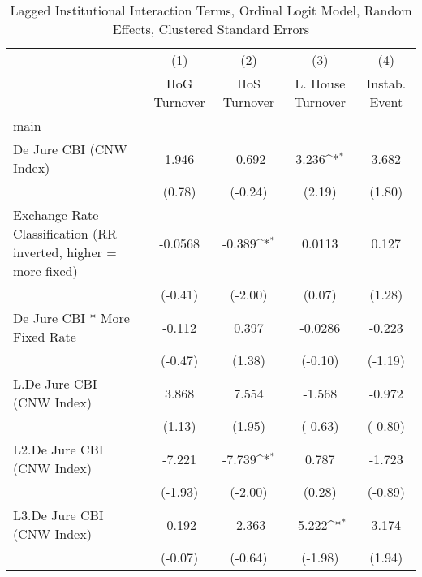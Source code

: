 {
\def\sym#1{\ifmmode^{#1}\else\(^{#1}\)\fi}
\begin{longtable}{l*{4}{c}}
\caption{Lagged Institutional Interaction Terms, Ordinal Logit Model, Random Effects, Clustered Standard Errors \label{intlagordLogLogDJ}}\\
\hline\hline\endfirsthead\hline\endhead\hline\endfoot\endlastfoot
                &\multicolumn{1}{c}{(1)}&\multicolumn{1}{c}{(2)}&\multicolumn{1}{c}{(3)}&\multicolumn{1}{c}{(4)}\\
                &\multicolumn{1}{c}{HoG Turnover}&\multicolumn{1}{c}{HoS Turnover}&\multicolumn{1}{c}{L. House Turnover}&\multicolumn{1}{c}{Instab. Event}\\
\hline
main            &                  &                  &                  &                  \\
De Jure CBI (CNW Index)&    1.946         &   -0.692         &    3.236\sym{*}  &    3.682         \\
                &   (0.78)         &  (-0.24)         &   (2.19)         &   (1.80)         \\
[1em]
Exchange Rate Classification (RR inverted, higher = more fixed)&  -0.0568         &   -0.389\sym{*}  &   0.0113         &    0.127         \\
                &  (-0.41)         &  (-2.00)         &   (0.07)         &   (1.28)         \\
[1em]
De Jure CBI * More Fixed Rate&   -0.112         &    0.397         &  -0.0286         &   -0.223         \\
                &  (-0.47)         &   (1.38)         &  (-0.10)         &  (-1.19)         \\
[1em]
L.De Jure CBI (CNW Index)&    3.868         &    7.554         &   -1.568         &   -0.972         \\
                &   (1.13)         &   (1.95)         &  (-0.63)         &  (-0.80)         \\
[1em]
L2.De Jure CBI (CNW Index)&   -7.221         &   -7.739\sym{*}  &    0.787         &   -1.723         \\
                &  (-1.93)         &  (-2.00)         &   (0.28)         &  (-0.89)         \\
[1em]
L3.De Jure CBI (CNW Index)&   -0.192         &   -2.363         &   -5.222\sym{*}  &    3.174         \\
                &  (-0.07)         &  (-0.64)         &  (-1.98)         &   (1.94)         \\

\end{longtable}}
